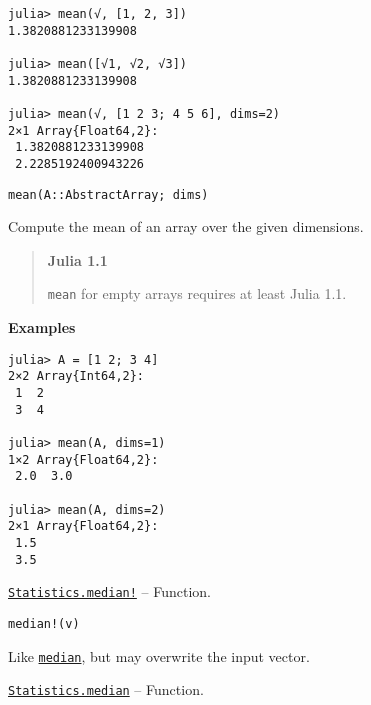 \begin{adjustwidth}{2em}{0pt}
\begin{verbatim}
julia> mean(√, [1, 2, 3])
1.3820881233139908

julia> mean([√1, √2, √3])
1.3820881233139908

julia> mean(√, [1 2 3; 4 5 6], dims=2)
2×1 Array{Float64,2}:
 1.3820881233139908
 2.2285192400943226
\end{verbatim}




\begin{lstlisting}
mean(A::AbstractArray; dims)
\end{lstlisting}

Compute the mean of an array over the given dimensions.

\begin{quote}
\textbf{Julia 1.1}

\texttt{mean} for empty arrays requires at least Julia 1.1.

\end{quote}
\textbf{Examples}


\begin{verbatim}
julia> A = [1 2; 3 4]
2×2 Array{Int64,2}:
 1  2
 3  4

julia> mean(A, dims=1)
1×2 Array{Float64,2}:
 2.0  3.0

julia> mean(A, dims=2)
2×1 Array{Float64,2}:
 1.5
 3.5
\end{verbatim}



\end{adjustwidth}
\hypertarget{5238557773914917939}{} 
\hyperlink{5238557773914917939}{\texttt{Statistics.median!}}  -- {Function.}

\begin{adjustwidth}{2em}{0pt}


\begin{verbatim}
median!(v)
\end{verbatim}

Like \hyperlink{7663137055249909841}{\texttt{median}}, but may overwrite the input vector.



\end{adjustwidth}
\hypertarget{7663137055249909841}{} 
\hyperlink{7663137055249909841}{\texttt{Statistics.median}}  -- {Function.}

